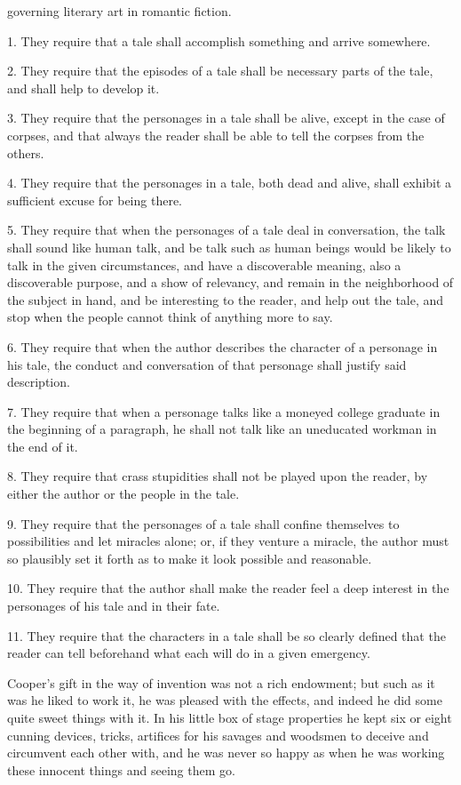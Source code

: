 \documentclass{novelette} %
\begin{document}
 governing literary art in romantic fiction.

1. They require that a tale shall accomplish something and arrive somewhere.

2. They require that the episodes of a tale shall be necessary parts of
the tale, and shall help to develop it.

3. They require that the personages in a tale shall be alive, except in
the case of corpses, and that always the reader shall be able to tell
the corpses from the others.

4. They require that the personages in a tale, both dead and alive,
shall exhibit a sufficient excuse for being there.

5. They require that when the personages of a tale deal in conversation,
the talk shall sound like human talk, and be talk such as human
beings would be likely to talk in the given circumstances, and have
a discoverable meaning, also a discoverable purpose, and a show of
relevancy, and remain in the neighborhood of the subject in hand, and
be interesting to the reader, and help out the tale, and stop when the
people cannot think of anything more to say.

6. They require that when the author describes the character of a
personage in his tale, the conduct and conversation of that personage
shall justify said description.

7. They require that when a personage talks like a moneyed college graduate
in the beginning of a paragraph, he shall not talk like an uneducated workman
in the end of it.

8. They require that crass stupidities shall not be played upon the
reader, by either the author or the people in the tale.

9. They require that the personages of a tale shall confine themselves
to possibilities and let miracles alone; or, if they venture a miracle,
the author must so plausibly set it forth as to make it look possible
and reasonable.

10. They require that the author shall make the reader feel a deep
interest in the personages of his tale and in their fate.

11. They require that the characters in a tale shall be so clearly
defined that the reader can tell beforehand what each will do in a given
emergency.


Cooper's gift in the way of invention was not a rich endowment; but
such as it was he liked to work it, he was pleased with the effects,
and indeed he did some quite sweet things with it. In his little box of
stage properties he kept six or eight cunning devices, tricks, artifices
for his savages and woodsmen to deceive and circumvent each other with,
and he was never so happy as when he was working these innocent things
and seeing them go.
\end{document}
